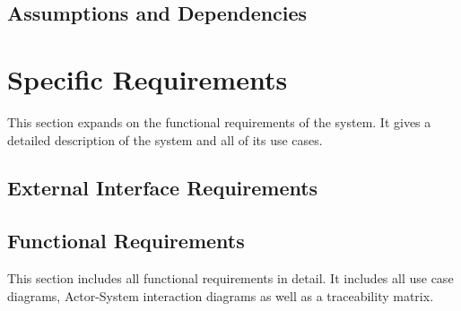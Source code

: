 \documentclass{article}
\begin{document}
	\subsection{Assumptions and Dependencies}
	
	\section{Specific Requirements}
	This section expands on the functional requirements of the system. It gives a detailed 	description of the system and all of its use cases.
	
	\subsection{External Interface Requirements}
	
	\subsection{Functional Requirements}
	This section includes all functional requirements in detail. It includes all use case diagrams, Actor-System interaction diagrams as well as a traceability matrix.	
	
\end{document}
